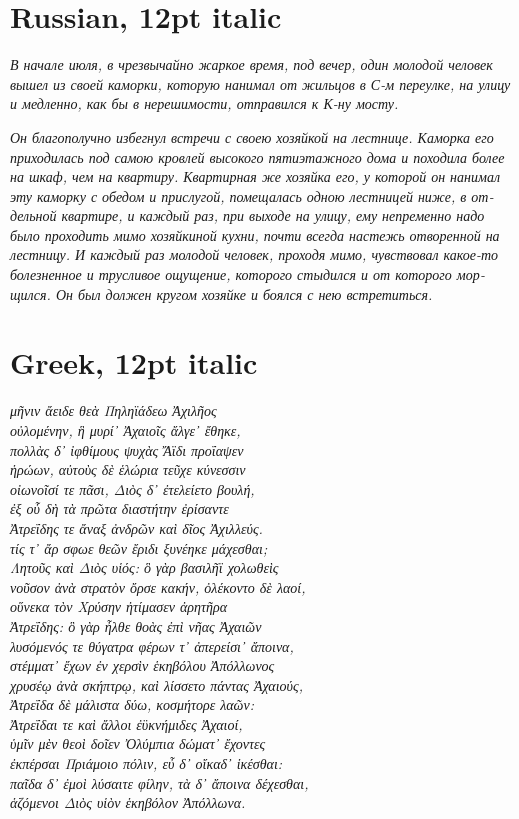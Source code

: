 \documentclass[12pt]{book}
\newcommand{\cyrillicfont}{\stdfont}
\newcommand{\greekfont}{\stdfont}
\newcommand{\russ}[1]{\textrussian{\cyrillicfont#1}}
\newcommand{\grek}[1]{\textgreek{\greekfont\addfontfeature{Weight=400}#1}}
\begin{document}
\section*{Russian, 12pt italic}

\russ{\itshape В начале июля, в чрезвычайно жаркое время, под вечер, один молодой
человек вышел из своей каморки, которую нанимал от жильцов в С-м
переулке, на улицу и медленно, как бы в нерешимости, отправился к К-ну
мосту.}

\russ{\itshape Он благополучно избегнул встречи с своею хозяйкой на лестнице. Каморка
его приходилась под самою кровлей высокого пятиэтажного дома и
походила более на шкаф, чем на квартиру. Квартирная же хозяйка его, у
которой он нанимал эту каморку с обедом и прислугой, помещалась одною
лестницей ниже, в отдельной квартире, и каждый раз, при выходе на
улицу, ему непременно надо было проходить мимо хозяйкиной кухни, почти
всегда настежь отворенной на лестницу. И каждый раз молодой человек,
проходя мимо, чувствовал какое-то болезненное и трусливое ощущение,
которого стыдился и от которого морщился. Он был должен кругом хозяйке
и боялся с нею встретиться.}

\section*{Greek, 12pt italic}
\noindent\grek{\itshape μῆνιν ἄειδε θεὰ Πηληϊάδεω Ἀχιλῆος\\
οὐλομένην, ἣ μυρί᾽ Ἀχαιοῖς ἄλγε᾽ ἔθηκε,\\
πολλὰς δ᾽ ἰφθίμους ψυχὰς Ἄϊδι προΐαψεν\\
ἡρώων, αὐτοὺς δὲ ἑλώρια τεῦχε κύνεσσιν\\
οἰωνοῖσί τε πᾶσι, Διὸς δ᾽ ἐτελείετο βουλή,\\
ἐξ οὗ δὴ τὰ πρῶτα διαστήτην ἐρίσαντε\\
Ἀτρεΐδης τε ἄναξ ἀνδρῶν καὶ δῖος Ἀχιλλεύς.\\
τίς τ᾽ ἄρ σφωε θεῶν ἔριδι ξυνέηκε μάχεσθαι;\\
Λητοῦς καὶ Διὸς υἱός: ὃ γὰρ βασιλῆϊ χολωθεὶς\\
νοῦσον ἀνὰ στρατὸν ὄρσε κακήν, ὀλέκοντο δὲ λαοί,\\
οὕνεκα τὸν Χρύσην ἠτίμασεν ἀρητῆρα\\
Ἀτρεΐδης: ὃ γὰρ ἦλθε θοὰς ἐπὶ νῆας Ἀχαιῶν\\
λυσόμενός τε θύγατρα φέρων τ᾽ ἀπερείσι᾽ ἄποινα,\\
στέμματ᾽ ἔχων ἐν χερσὶν ἑκηβόλου Ἀπόλλωνος\\
χρυσέῳ ἀνὰ σκήπτρῳ, καὶ λίσσετο πάντας Ἀχαιούς,\\
Ἀτρεΐδα δὲ μάλιστα δύω, κοσμήτορε λαῶν:\\
Ἀτρεΐδαι τε καὶ ἄλλοι ἐϋκνήμιδες Ἀχαιοί,\\
ὑμῖν μὲν θεοὶ δοῖεν Ὀλύμπια δώματ᾽ ἔχοντες\\
ἐκπέρσαι Πριάμοιο πόλιν, εὖ δ᾽ οἴκαδ᾽ ἱκέσθαι:\\
παῖδα δ᾽ ἐμοὶ λύσαιτε φίλην, τὰ δ᾽ ἄποινα δέχεσθαι,\\
ἁζόμενοι Διὸς υἱὸν ἑκηβόλον Ἀπόλλωνα.}
\end{document}
